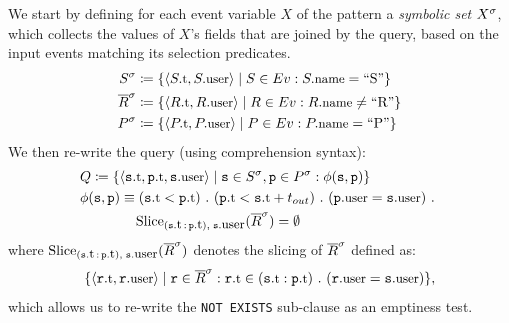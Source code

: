 We start by defining for each event variable $X$ of the pattern a 
{\em symbolic set} ${X}^{\sigma}$, which collects the values of $X$'s fields that 
are joined by the query, based on the input events matching its selection 
predicates.
\begin{align*}
\syms{S} 
&\coloneq 
\{ \tuple{\facc{S}{t}, \facc{S}{user}} \mid 
S \in \Ev: \facc{S}{name} = \text{``S''}
\}
\\
\syms{\oR} 
&\coloneq 
\{ \tuple{\facc{R}{t}, \facc{R}{user}} \mid 
R \in \Ev: \facc{R}{name} \neq \text{``R''}
\}
\\
\syms{P} 
&\coloneq 
\{ \tuple{\facc{P}{t}, \facc{P}{user}} \mid 
P \in \Ev: \facc{P}{name} = \text{``P''}
\}
\end{align*}
We then re-write the query (using comprehension syntax):
\begin{align*}
&
Q \coloneq 
\{ \tuple{\facc{\symv{s}}{t}, \facc{\symv{p}}{t}, \facc{\symv{s}}{user}} \mid 
\symv{s} \in \syms{S},
\symv{p} \in \syms{P}: \phi(\symv{s},\symv{p}) \}
\\ 
&
\phi(\symv{s},\symv{p}) \equiv 
(\facc{\symv{s}}{t} < \facc{\symv{p}}{t})\ .\  
(\facc{\symv{p}}{t} < \facc{\symv{s}}{t} + t_{out})\ .\ 
(\facc{\symv{p}}{user} = \facc{\symv{s}}{user})\ .\ 
\\
&\qqquad
\slice{\syms{\oR}}
      {(\facc{\symv{s}}{t}\,:\,\facc{\symv{p}}{t}),\; \facc{\symv{s}}{user}} 
= \emptyset  
\end{align*}
where 
$\slice{\syms{\oR}}
       {(\facc{\symv{s}}{t}\,:\,\facc{\symv{p}}{t}),\; \facc{\symv{s}}{user}}$
denotes the slicing of ${\overline{R}}^{\sigma}$ defined as:
\begin{align*}
\{ \tuple{ \facc{\symv{r}}{t}, \facc{\symv{r}}{user}} \mid 
\symv{r} \in \syms{\oR} : 
\facc{\symv{r}}{t} \in (\facc{\symv{s}}{t} : \facc{\symv{p}}{t})\ .\ 
(\facc{\symv{r}}{user} = \facc{\symv{s}}{user})
\},
\end{align*}
which allows us to re-write the \texttt{NOT EXISTS} sub-clause as an emptiness 
test.



